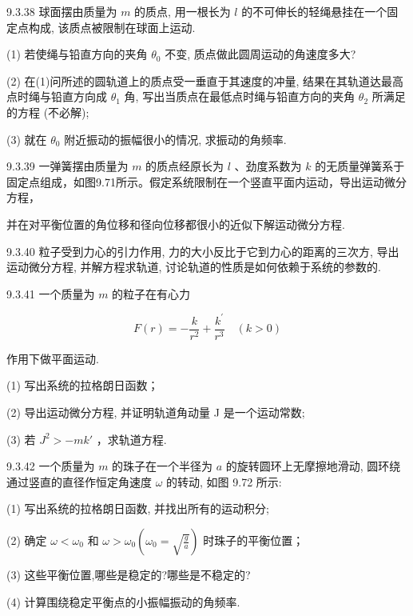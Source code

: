 \begin{problem}{9.3.38}
球面摆由质量为 $m$ 的质点, 用一根长为 $l$ 的不可伸长的轻绳悬挂在一个固定点构成, 该质点被限制在球面上运动.

(1) 若使绳与铅直方向的夹角 $\theta_{0}$ 不变, 质点做此圆周运动的角速度多大?

(2) 在(1)问所述的圆轨道上的质点受一垂直于其速度的冲量, 结果在其轨道达最高点时绳与铅直方向成 $\theta_{1}$ 角, 写出当质点在最低点时绳与铅直方向的夹角 $\theta_{2}$ 所满足的方程 (不必解);

(3) 就在 $\theta_{0}$ 附近振动的振幅很小的情况, 求振动的角频率.
\end{problem}
\clearpage


\begin{problem}{9.3.39}
一弹簧摆由质量为 $m$ 的质点经原长为 $l$ 、劲度系数为 $k$ 的无质量弹簧系于固定点组成，如图9.71所示。假定系统限制在一个竖直平面内运动，导出运动微分方程，

并在对平衡位置的角位移和径向位移都很小的近似下解运动微分方程.
\begin{center}

\end{center}
\end{problem}
\clearpage


\begin{problem}{9.3.40}
粒子受到力心的引力作用, 力的大小反比于它到力心的距离的三次方, 导出运动微分方程, 并解方程求轨道, 讨论轨道的性质是如何依赖于系统的参数的.
\end{problem}
\clearpage


\begin{problem}{9.3.41}
一个质量为 $m$ 的粒子在有心力

\[
F (r) = - \frac {k}{r ^ {2}} + \frac {k ^ {\prime}}{r ^ {3}} \quad (k > 0)
\]

作用下做平面运动.

(1) 写出系统的拉格朗日函数；

(2) 导出运动微分方程, 并证明轨道角动量 J 是一个运动常数;

(3) 若 $J^{2}>-mk'$ ，求轨道方程.
\end{problem}
\clearpage


\begin{problem}{9.3.42}
一个质量为 $m$ 的珠子在一个半径为 $a$ 的旋转圆环上无摩擦地滑动, 圆环绕通过竖直的直径作恒定角速度 $\omega$ 的转动, 如图 9.72 所示:

(1) 写出系统的拉格朗日函数, 并找出所有的运动积分;

(2) 确定 $\omega < \omega_0$ 和 $\omega > \omega_0\left(\omega_0 = \sqrt{\frac{g}{a}}\right)$ 时珠子的平衡位置；

(3) 这些平衡位置,哪些是稳定的?哪些是不稳定的?

(4) 计算围绕稳定平衡点的小振幅振动的角频率.
\begin{center}

\end{center}
\end{problem}
\clearpage


